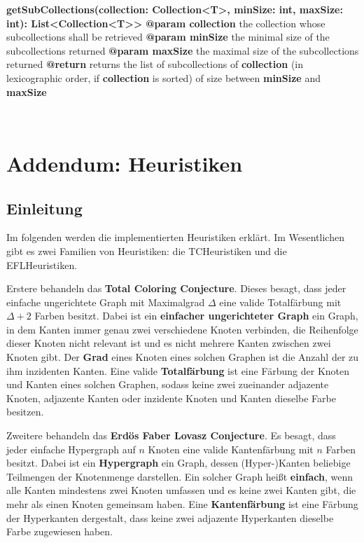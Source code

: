 \documentclass{article}
\begin{document}
\begin{enumerate}[+]
{			\textbf{getSubCollections(collection: Collection<T>, minSize: int, maxSize: int): List<Collection<T>>} \newline
			\textbf{@param collection} the collection whose subcollections shall be retrieved \newline
			\textbf{@param minSize} the minimal size of the subcollections returned \newline
			\textbf{@param maxSize} the maximal size of the subcollections returned \newline
			\textbf{@return} returns the list of subcollections of \textbf{collection} (in lexicographic order, if \textbf{collection} is sorted) of size between \textbf{minSize} and \textbf{maxSize}
		}
	\end{enumerate}
	
	
	
	~\newpage
	
	\section{Addendum: Heuristiken}
	\subsection{Einleitung}
	Im folgenden werden die implementierten Heuristiken erklärt. Im Wesentlichen gibt es zwei Familien von Heuristiken: die TCHeuristiken und die EFLHeuristiken.
	
	Erstere behandeln das \textbf{Total Coloring Conjecture}. Dieses besagt, dass jeder einfache ungerichtete Graph mit Maximalgrad $\Delta$ eine valide Totalfärbung mit $\Delta+2$ Farben besitzt. Dabei ist ein \textbf{einfacher ungerichteter Graph} ein Graph, in dem Kanten immer genau zwei verschiedene Knoten verbinden, die Reihenfolge dieser Knoten nicht relevant ist und es nicht mehrere Kanten zwischen zwei Knoten gibt. Der \textbf{Grad} eines Knoten eines solchen Graphen ist die Anzahl der zu ihm inzidenten Kanten. Eine valide \textbf{Totalfärbung} ist eine Färbung der Knoten und Kanten eines solchen Graphen, sodass keine zwei zueinander adjazente Knoten, adjazente Kanten oder inzidente Knoten und Kanten dieselbe Farbe besitzen. 
	
	Zweitere behandeln das \textbf{Erdös Faber Lovasz Conjecture}. Es besagt, dass jeder einfache Hypergraph auf $n$ Knoten eine valide Kantenfärbung mit $n$ Farben besitzt. Dabei ist ein \textbf{Hypergraph} ein Graph, dessen (Hyper-)Kanten beliebige Teilmengen der Knotenmenge darstellen. Ein solcher Graph heißt \textbf{einfach}, wenn alle Kanten mindestens zwei Knoten umfassen und es keine zwei Kanten gibt, die mehr als einen Knoten gemeinsam haben. Eine \textbf{Kantenfärbung} ist eine Färbung der Hyperkanten dergestalt, dass keine zwei adjazente Hyperkanten dieselbe Farbe zugewiesen haben.
	
\end{document}
